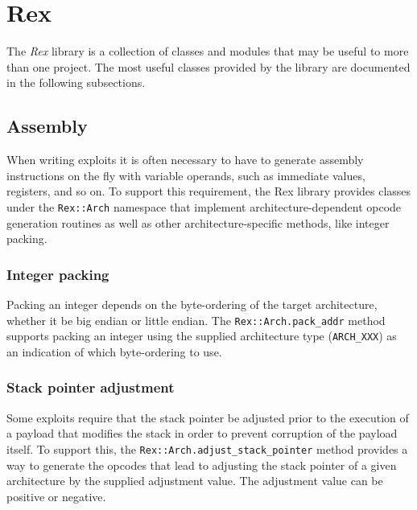 \documentclass{report}
\begin{document}
    \section{Rex}

\par
The \textit{Rex} library is a collection of classes and modules that
may be useful to more than one project.  The most useful classes
provided by the library are documented in the following subsections.

        \subsection{Assembly}

\par
When writing exploits it is often necessary to have to generate
assembly instructions on the fly with variable operands, such as
immediate values, registers, and so on.  To support this
requirement, the Rex library provides classes under the
\texttt{Rex::Arch} namespace that implement architecture-dependent
opcode generation routines as well as other architecture-specific
methods, like integer packing.

            \subsubsection{Integer packing}

\par
Packing an integer depends on the byte-ordering of the target
architecture, whether it be big endian or little endian.  The
\texttt{Rex::Arch.pack\_addr} method supports packing an integer
using the supplied architecture type (\texttt{ARCH\_XXX}) as an
indication of which byte-ordering to use.

            \subsubsection{Stack pointer adjustment}

\par
Some exploits require that the stack pointer be adjusted prior to
the execution of a payload that modifies the stack in order to
prevent corruption of the payload itself.  To support this, the
\texttt{Rex::Arch.adjust\_stack\_pointer} method provides a way to
generate the opcodes that lead to adjusting the stack pointer of a
given architecture by the supplied adjustment value.  The adjustment
value can be positive or negative.
\end{document}
